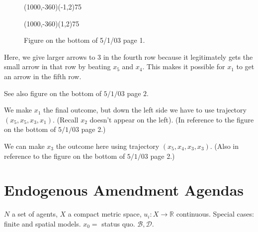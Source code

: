 \documentclass[12pt]{article}
\newcommand{\n}{\noindent}
\newcommand{\s}{\vspace{5mm}}
\begin{document}
\begin{figure}[htb]
\begin{egame}
\renewcommand{\egarrowstyle}{e}

\putbranch(1000,-360)(-1,2){75}

\renewcommand{\egarrowstyle}{e}

\putbranch(1000,-360)(1,2){75}






%
\end{egame}
\hspace*{\fill}\s\s\s\s\s\s\s\s\s\s\s\s
\caption[]{Figure on the bottom of 5/1/03 page 1.}\label{f:sixteen}
\end{figure}

\s
\n  Here, we give larger arrows to $3$ in the fourth row because it legitimately gets the small arrow in that row by beating $x_5$ and $x_4$.  This makes it possible for $x_1$ to get an arrow in the fifth row.  

\begin{center}  See also figure on the bottom of $5/1/03$ page $2$.  
\end{center}

\s
\n  We make $x_1$ the final outcome, but down the left side we have to use trajectory $(x_5,x_5,x_3,x_1)$.  (Recall $x_2$ doesn't appear on the left).  (In reference to the figure on the bottom of $5/1/03$ page 2.)

\s
\n  We can make $x_3$ the outcome here using trajectory $(x_5,x_4,x_3,x_3)$.  (Also in reference to the figure on the bottom of $5/1/03$ page 2.)

\section{Endogenous Amendment Agendas}
\s
\n  $N$ a set of agents, $X$ a compact metric space, $u_i:X\longrightarrow \mathbb{R}$ continuous.  Special cases: finite and spatial models.  $x_0=$ status quo.  $\mathcal{B},\mathcal{D}$.
\end{document}
